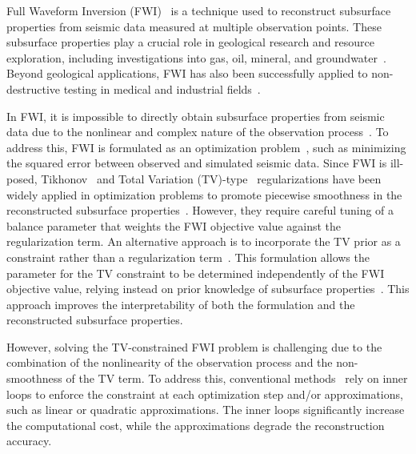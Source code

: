 Full Waveform Inversion (FWI)~\cite{FWI0,FWI1} is a technique used to reconstruct subsurface properties from seismic data measured at multiple observation points.
These subsurface properties play a crucial role in geological research and resource exploration, including investigations into gas, oil, mineral, and groundwater~\cite{FWI1,FWIApplicationGroundwater0,FWIApplicationGroundwater1}.
Beyond geological applications, FWI has also been successfully applied to non-destructive testing in medical and industrial fields~\cite{FWIApplicationNonDestructiveTesting0,FWIApplicationNonDestructiveTesting1}.

In FWI, it is impossible to directly obtain subsurface properties from seismic data due to the nonlinear and complex nature of the observation process~\cite{FWI1}.
To address this, FWI is formulated as an optimization problem~\cite{FWI0,CustomFWI0,CustomFWI1,CustomFWI2,CustomFWI3,CustomFWI4,CustomFWI5}, such as minimizing the squared error between observed and simulated seismic data.
Since FWI is ill-posed, Tikhonov~\cite{tikhonov} and Total Variation (TV)-type~\cite{TV,TGV} regularizations have been widely applied in optimization problems to promote piecewise smoothness in the reconstructed subsurface properties~\cite{FWI-with-tikhonov-regularization,FWI-with-TV-regularization,FWI-with-directional-TV-regularization,FWI-with-high-order-TV-regularization,FWI-with-TGV-regularization}.
However, they require careful tuning of a balance parameter that weights the FWI objective value against the regularization term.
An alternative approach is to incorporate the TV prior as a constraint rather than a regularization term~\cite{FWI-with-TV-constraint,FWI-with-TV-constraint2,FWI-with-TV-constraint3,FWI-with-TV-constraint4}.
This formulation allows the parameter for the TV constraint to be determined independently of the FWI objective value, relying instead on prior knowledge of subsurface properties~\mbox{\cite{constraint0,constraint1,constraint2,constraint3,constraint4,constraints-vs-penalties-in-FWI}}.
This approach improves the interpretability of both the formulation and the reconstructed subsurface properties.

However, solving the TV-constrained FWI problem is challenging due to the combination of the nonlinearity of the observation process and the non-smoothness of the TV term.
To address this, conventional methods~\cite{FWI-with-TV-constraint,FWI-with-TV-constraint2,FWI-with-TV-constraint3,FWI-with-TV-constraint4} rely on inner loops to enforce the constraint at each optimization step and/or approximations, such as linear or quadratic approximations.
The inner loops significantly increase the computational cost, while the approximations degrade the reconstruction accuracy.

